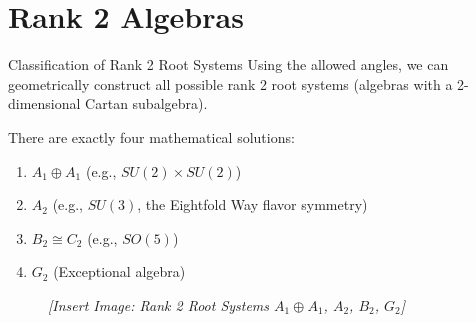 \section{Rank 2 Algebras}

\begin{frame}{Classification of Rank 2 Root Systems}
    Using the allowed angles, we can geometrically construct all possible rank 2 root systems (algebras with a 2-dimensional Cartan subalgebra).

    \vspace{0.3cm}
    There are exactly four mathematical solutions:
    \begin{enumerate}
        \item $A_1 \oplus A_1$ (e.g., $SU(2) \times SU(2)$)
        \item $A_2$ (e.g., $SU(3)$, the Eightfold Way flavor symmetry)
        \item $B_2 \cong C_2$ (e.g., $SO(5)$)
        \item $G_2$ (Exceptional algebra)
    \end{enumerate}

    \vspace{0.3cm}
    \begin{figure}
        \centering
        \textit{[Insert Image: Rank 2 Root Systems $A_1 \oplus A_1$, $A_2$, $B_2$, $G_2$]}
    \end{figure}
\end{frame}